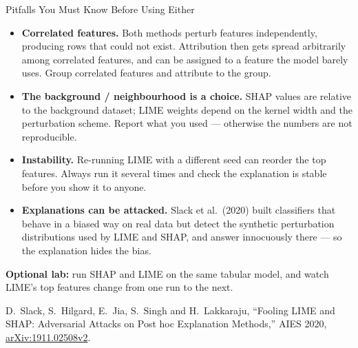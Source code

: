 \begin{frame}[allowframebreaks]{Pitfalls You Must Know Before Using Either}

    \begin{itemize}
        \setlength\itemsep{0.5em}
        \item \textbf{Correlated features.} Both methods perturb features independently, producing
              rows that could not exist. Attribution then gets spread arbitrarily among correlated
              features, and can be assigned to a feature the model barely uses. Group correlated
              features and attribute to the group.

        \item \textbf{The background / neighbourhood is a choice.} SHAP values are relative to the
              background dataset; LIME weights depend on the kernel width and the perturbation
              scheme. Report what you used --- otherwise the numbers are not reproducible.

        \item \textbf{Instability.} Re-running LIME with a different seed can reorder the top
              features. Always run it several times and check the explanation is stable before
              you show it to anyone.

        \item \textbf{Explanations can be attacked.} Slack et al.\ (2020) built classifiers that
              behave in a biased way on real data but detect the synthetic perturbation
              distributions used by LIME and SHAP, and answer innocuously there --- so the
              explanation hides the bias.
    \end{itemize}

    \vspace{0.5em}
    \begin{block}{}
        \centering
        \small \textbf{Optional lab:} run SHAP and LIME on the same tabular model, and watch LIME's top features
        change from one run to the next.
    \end{block}

    \vspace{0.3em}
    {\scriptsize D.~Slack, S.~Hilgard, E.~Jia, S.~Singh and H.~Lakkaraju, ``Fooling LIME and SHAP:
    Adversarial Attacks on Post hoc Explanation Methods,'' AIES 2020,
    \href{https://arxiv.org/abs/1911.02508v2}{arXiv:1911.02508v2}.}
\end{frame}

